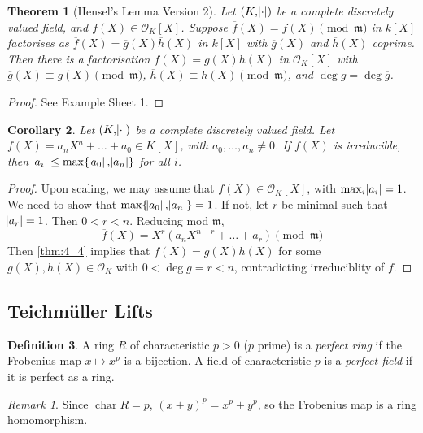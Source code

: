 \documentclass[11pt]{article}
\theoremstyle{definition}
\newtheorem{definition}{Definition}[subsection]
\theoremstyle{plain}
\newtheorem{theorem}[definition]{Theorem}
\newtheorem{corollary}[definition]{Corollary}
\theoremstyle{remark}
\newtheorem*{remark}{Remark}
\DeclareMathOperator{\Char}{char}
\newcommand{\cO}{\mathcal{O}}
\newcommand{\fm}{\mathfrak{m}}
\begin{document}
\begin{theorem}[Hensel's Lemma Version 2]\label{thm:4_4}
    Let $(K, \abs{\cdot})$ be a complete discretely valued field, and $f(X) \in \cO_K[X]$. Suppose $\overline{f}(X) = f(X) \pmod{\fm}$ in $k[X]$ factorises as $\overline{f}(X) = \overline{g}(X) \overline{h}(X)$ in $k[X]$ with $\overline{g}(X)$ and $\overline{h}(X)$ coprime. Then there is a factorisation $f(X) = g(X) h(X)$ in $\cO_K[X]$ with $\overline{g}(X) \equiv g(X) \pmod{\fm}$, $\overline{h}(X) \equiv h(X) \pmod{\fm}$, and $\deg{g} = \deg{\overline{g}}$.
\end{theorem}
\begin{proof}
    See Example Sheet 1.
\end{proof}

\begin{corollary}\label{cor:4_5}
    Let $(K, \abs{\cdot})$ be a complete discretely valued field. Let $f(X) = a_n X^n + \ldots + a_0 \in K[X]$, with $a_0, \ldots, a_n \neq 0$. If $f(X)$ is irreducible, then $\abs{a_i} \le \max\{\abs{a_0}, \abs{a_n}\}$ for all $i$.
\end{corollary}

\begin{proof}
    Upon scaling, we may assume that $f(X) \in \cO_K[X]$, with $\max_i \abs{a_i} = 1$. We need to show that $\max \{\abs{a_0}, \abs{a_n}\} = 1$. If not, let $r$ be minimal such that $\abs{a_r} = 1$. Then $0 < r < n$. Reducing mod $\fm$,
    \begin{equation*}
        \overline{f}(X) = X^r (a_n X^{n-r} + \ldots + a_r) \pmod{\fm}
    \end{equation*}
    Then \autoref{thm:4_4} implies that $f(X) = g(X) h(X)$ for some $g(X), h(X) \in \cO_K$ with $0 < \deg{g} = r < n$, contradicting irreduciblity of $f$.
\end{proof}

\subsection{Teichm\"uller Lifts}

\begin{definition}
    A ring $R$ of characteristic $p > 0$ ($p$ prime) is a \emph{perfect ring} if the Frobenius map $x \mapsto x^p$ is a bijection. A field of characteristic $p$ is a \emph{perfect field} if it is perfect as a ring.
\end{definition}

\begin{remark}
    Since $\Char R = p$, $(x+y)^p = x^p + y^p$, so the Frobenius map is a ring homomorphism.
\end{remark}
\end{document}
